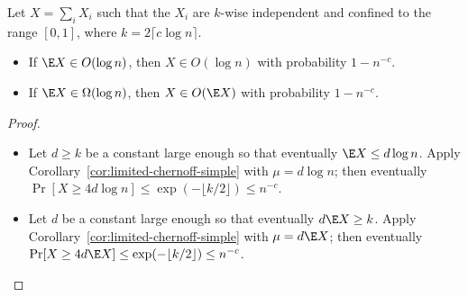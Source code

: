 \documentclass[11pt,a4paper]{article}
\begin{document}
\begin{tcolorbox}
  \begin{corollary}
    Let \(X = \sum_i X_i\) such that the \(X_i\) are \(k\)-wise independent and confined to the range \([0, 1]\), where \(k = 2\lceil c\log n \rceil\).
    \begin{itemize}
    \item If \(\E X \in O(\log n)\), then  \(X \in O(\log n)\) with probability \(1 - n^{-c}\).
    \item If \(\E X \in \Omega(\log n)\), then \(X \in O(\E X)\) with probability \(1 - n^{-c}\).
    \end{itemize}
  \end{corollary}
\end{tcolorbox}
\begin{proof}\hfill
  \begin{itemize}
  \item
    Let \(d \ge k\) be a constant large enough so that eventually \(\E X \le d \log n\).
    Apply Corollary~\ref{cor:limited-chernoff-simple} with \(\mu = d \log n\); 
    then eventually \(\Pr[X \ge 4d \log n] \le \exp(-\lfloor k/2 \rfloor) \le n^{-c}\).
  \item
    Let \(d\) be a constant large enough so that eventually \(d \E X \ge k\).
    Apply Corollary~\ref{cor:limited-chernoff-simple} with \(\mu = d\E X\);
    then eventually \(\Pr[X \ge 4d\E X] \le \exp(-\lfloor k/2 \rfloor) \le n^{-c}\).
  \end{itemize}
\end{proof}
\end{document}
